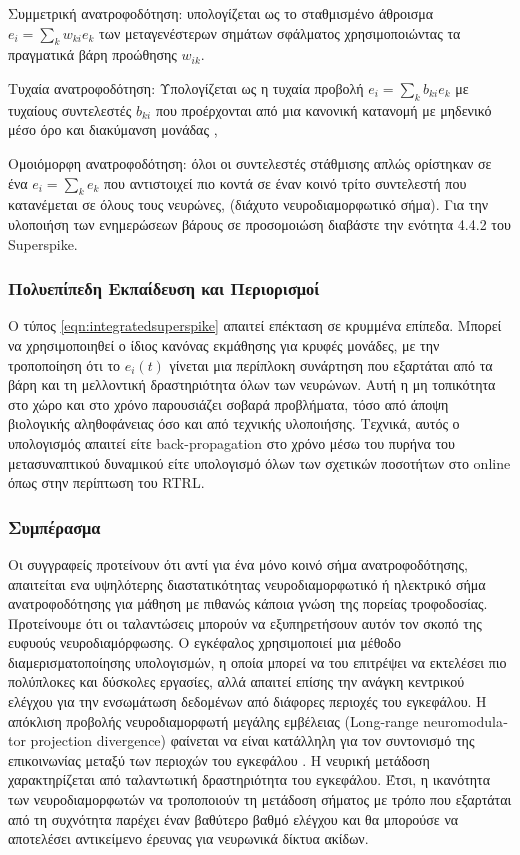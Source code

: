 \documentclass[12pt]{report}
\begin{document}
Συμμετρική ανατροφοδότηση: υπολογίζεται ως το σταθμισμένο άθροισμα $e_{i}=\sum_{k} w_{k i} e_{k}$  των μεταγενέστερων σημάτων σφάλματος χρησιμοποιώντας τα πραγματικά βάρη προώθησης $w_{i k} .$  

Τυχαία ανατροφοδότηση: Υπολογίζεται ως η τυχαία προβολή $e_{i}=\sum_{k} b_{k i} e_{k}$ με τυχαίους συντελεστές $b_{k i}$ που προέρχονται από μια κανονική κατανομή με μηδενικό μέσο όρο και διακύμανση μονάδας ,

Ομοιόμορφη ανατροφοδότηση: όλοι οι συντελεστές στάθμισης απλώς ορίστηκαν σε ένα $e_{i}=\sum_{k} e_{k}$ που αντιστοιχεί πιο κοντά σε έναν κοινό τρίτο συντελεστή που κατανέμεται σε όλους τους νευρώνες, (διάχυτο νευροδιαμορφωτικό σήμα). Για την υλοποιήση των ενημερώσεων βάρους σε προσομοιώση διαβάστε την ενότητα 4.4.2 του \textlatin{Superspike}. 


\subsubsection{Πολυεπίπεδη Εκπαίδευση και Περιορισμοί}

Ο τύπος \ref{eqn:integratedsuperspike} απαιτεί επέκταση σε κρυμμένα επίπεδα. Μπορεί να χρησιμοποιηθεί ο ίδιος κανόνας εκμάθησης για κρυφές μονάδες, με την τροποποίηση ότι το $e_{i}(t)$ γίνεται μια περίπλοκη συνάρτηση που εξαρτάται από τα βάρη και τη μελλοντική δραστηριότητα όλων των νευρώνων. Αυτή η μη τοπικότητα στο χώρο και στο χρόνο παρουσιάζει σοβαρά προβλήματα, τόσο από άποψη βιολογικής αληθοφάνειας όσο και από τεχνικής υλοποιήσης. Τεχνικά, αυτός ο υπολογισμός απαιτεί είτε \textlatin{back-propagation} στο χρόνο μέσω του πυρήνα του μετασυναπτικού δυναμικού είτε υπολογισμό όλων των σχετικών ποσοτήτων στο \textlatin{online} όπως στην περίπτωση του \textlatin{RTRL}.
\subsubsection{Συμπέρασμα}
Οι συγγραφείς προτείνουν ότι αντί για ένα μόνο κοινό σήμα ανατροφοδότησης, απαιτείται ενα υψηλότερης διαστατικότητας νευροδιαμορφωτικό ή ηλεκτρικό σήμα ανατροφοδότησης για μάθηση με πιθανώς κάποια γνώση της πορείας τροφοδοσίας. Προτείνουμε ότι οι ταλαντώσεις μπορούν να εξυπηρετήσουν αυτόν τον σκοπό της ευφυούς νευροδιαμόρφωσης. Ο εγκέφαλος χρησιμοποιεί μια μέθοδο διαμερισματοποίησης υπολογισμών, η οποία μπορεί να του επιτρέψει να εκτελέσει πιο πολύπλοκες και δύσκολες εργασίες, αλλά απαιτεί επίσης την ανάγκη κεντρικού ελέγχου για την ενσωμάτωση δεδομένων από διάφορες περιοχές του εγκεφάλου. Η απόκλιση προβολής νευροδιαμορφωτή μεγάλης εμβέλειας (\textlatin{Long-range neuromodulator projection divergence}) φαίνεται να είναι κατάλληλη για τον συντονισμό της επικοινωνίας μεταξύ των περιοχών του εγκεφάλου \cite{ito2008}. Η νευρική μετάδοση χαρακτηρίζεται από ταλαντωτική δραστηριότητα του εγκεφάλου. Έτσι, η ικανότητα των νευροδιαμορφωτών να τροποποιούν τη μετάδοση σήματος με τρόπο που εξαρτάται από τη συχνότητα παρέχει έναν βαθύτερο βαθμό ελέγχου και θα μπορούσε να αποτελέσει αντικείμενο έρευνας για νευρωνικά δίκτυα ακίδων.
\end{document}
